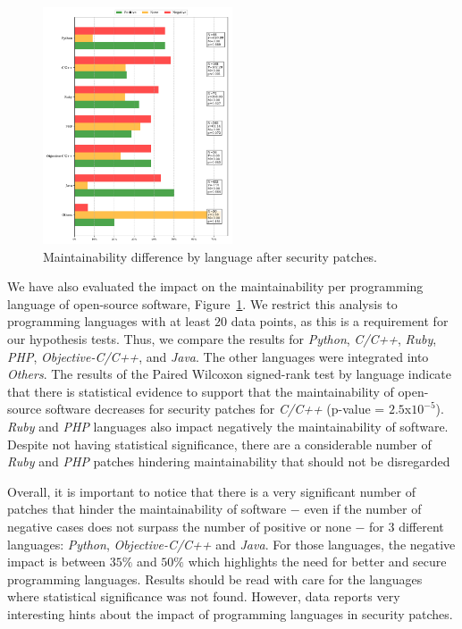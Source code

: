 \documentclass[10pt,conference]{IEEEtran}
\begin{document}
\begin{figure}[h]
  \centering
  \includegraphics[width=0.5\textwidth]{figures/maintainability_language.pdf}
  \caption{Maintainability difference by language after security patches.}
  \label{fig:lang_main}  
\end{figure}


We have also evaluated the impact on the maintainability per programming language
of open-source software, Figure~\ref{fig:lang_main}. We restrict this analysis to programming languages with at least $20$ data points, as this is a requirement for our hypothesis tests. Thus, we compare the results for \emph{Python}, \emph{C/C++}, \emph{Ruby}, \emph{PHP}, 
\emph{Objective-C/C++}, and \emph{Java}. The other languages were
integrated into \emph{Others}. The results of the Paired Wilcoxon signed-rank
test by language indicate that there is statistical evidence to support that the
maintainability of open-source software decreases for security patches for \emph{C/C++} 
(p-value = $2.5$x$10^{-5}$). 
\emph{Ruby} and \emph{PHP} languages also impact negatively the maintainability of software. Despite not having statistical significance, there are a considerable number of \emph{Ruby} and \emph{PHP} patches hindering maintainability that should not be disregarded

Overall, it is important to notice that there is a very significant number of patches that
hinder the maintainability of software $-$ even if the number of negative cases does not 
surpass the number of positive or none $-$ for  $3$ different languages: \emph{Python},
\emph{Objective-C/C++} and \emph{Java}. For those languages, the negative impact is between $35\%$ and $50\%$ which highlights the need for better and secure programming languages. 
Results should be read with care for the languages where statistical significance was not found. However, 
data reports very interesting hints about the impact of programming languages in 
security patches.
\end{document}
